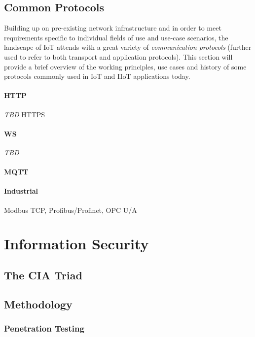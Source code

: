 \subsection{Common Protocols}
\label{sec:iot-common-protocols}
Building up on pre-existing network infrastructure and in order to meet requirements specific to individual fields of use and use-case scenarios, the landscape of \ac{IoT} attends with a great variety of \emph{communication protocols} (further used to refer to both transport and application protocols). This section will provide a brief overview of the working principles, use cases and history of some protocols commonly used in \ac{IoT} and \ac{IIoT} applications today.
\paragraph{\ac{HTTP}} \emph{TBD} %
\ac{HTTPS}
\paragraph{\ac{WS}} \emph{TBD}

\paragraph{\ac{MQTT}}
\cite{gupta_banks_2015}

\paragraph{Industrial} Modbus \ac{TCP}, Profibus/Profinet, \ac{OPC U/A}

\section{Information Security}
\label{sec:information-security}
\subsection{The CIA Triad}

\subsection{Methodology}
\subsubsection{Penetration Testing}
